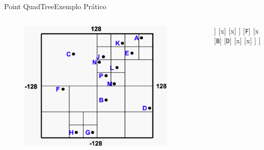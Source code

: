 \documentclass[red, tikz, aspectratio=169, xcolor=dvipsnames]{beamer}
\begin{document}
			
			\begin{frame}[fragile]{Point QuadTree}{Exemplo Prático}
				\centering
				\vspace{-40px}
				\begin{columns}
					\begin{column}{0.48\textwidth}
						\begin{figure}
							\centering
							\includegraphics[width=0.9\textwidth]{img/pr-quad.png}
						\end{figure}
					\end{column}
					\begin{column}{0.5\textwidth}
						\centering
						\fbox{
							\begin{forest}
								[\texttt{(x,y)}
								[NO]
								[NE]
								[SO]
								[SE]
								]
						\end{forest}}
						
						\begin{forest}
							[x
							[\texttt{C}
							]
							[x
							[x]
							[x
							[x]
							[\texttt{A}]
							[\texttt{E}]
							[x]
							]
							[x]
							[x]
							]
							[\texttt{F}]
							[x
							[\texttt{B}]
							[\texttt{D}]
							[x]
							[x]
							]
							]
						\end{forest}
						
					\end{column}
				\end{columns}
			\end{frame}
			
\end{document}

